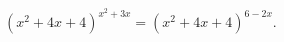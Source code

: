 \begin{ex}[type=equation]
	\begin{condition}
		$(x^2 + 4x + 4)^{x^2 + 3x} = (x^2 + 4x + 4)^{6 - 2x}.$
	\end{condition}
\end{ex}